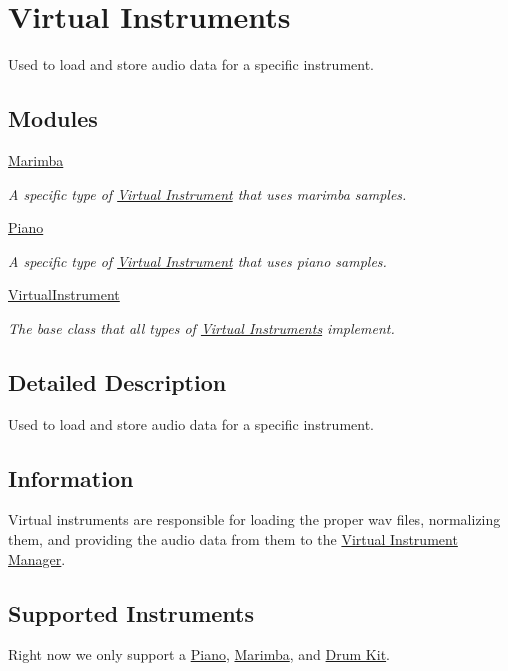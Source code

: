 \hypertarget{group___v_i}{}\section{Virtual Instruments}
\label{group___v_i}


Used to load and store audio data for a specific instrument.  


\subsection*{Modules}
\begin{DoxyCompactItemize}
\item 
\hyperlink{group___doc_mar}{Marimba}
\begin{DoxyCompactList}\small\item\em A specific type of \hyperlink{group___v_i}{Virtual Instrument} that uses marimba samples. \end{DoxyCompactList}\item 
\hyperlink{group___doc_piano}{Piano}
\begin{DoxyCompactList}\small\item\em A specific type of \hyperlink{group___v_i}{Virtual Instrument} that uses piano samples. \end{DoxyCompactList}\item 
\hyperlink{group___v_i_base}{Virtual\+Instrument}
\begin{DoxyCompactList}\small\item\em The base class that all types of \hyperlink{group___v_i}{Virtual Instruments} implement. \end{DoxyCompactList}\end{DoxyCompactItemize}


\subsection{Detailed Description}
Used to load and store audio data for a specific instrument. 

\hypertarget{group___v_i_VIInfo}{}\subsection{Information}\label{group___v_i_VIInfo}
Virtual instruments are responsible for loading the proper wav files, normalizing them, and providing the audio data from them to the \hyperlink{group___v_i_m}{Virtual Instrument Manager}.\hypertarget{group___v_i_VISuppInst}{}\subsection{Supported Instruments}\label{group___v_i_VISuppInst}
Right now we only support a \hyperlink{class_piano}{Piano}, \hyperlink{class_marimba}{Marimba}, and \hyperlink{class_drum_kit}{Drum Kit}. 